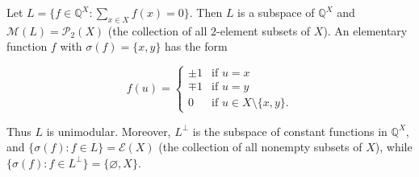 Let $L = \{f \in \mathbb{Q}^X : \sum_{x \in X} f(x) = 0\}$. Then $L$ is a subspace of $\mathbb{Q}^X$ and $\mathcal{M}(L) = \mathcal{P}_2(X)$ (the collection of all $2$-element subsets of $X$). An elementary function $f$ with $\sigma(f) = \{x, y\}$ has the form

$$f(u) = \begin{cases} \pm 1 & \text{if } u = x \\ \mp 1 & \text{if } u = y \\ 0 & \text{if } u \in X \setminus \{x, y\}. \end{cases}$$

Thus $L$ is unimodular. Moreover, $L^{\perp}$ is the subspace of constant functions in $\mathbb{Q}^X$, and $\{\sigma(f) : f \in L\} = \mathcal{E}(X)$ (the collection of all nonempty subsets of $X$), while $\{\sigma(f) : f \in L^{\perp}\} = \{\varnothing, X\}$.

